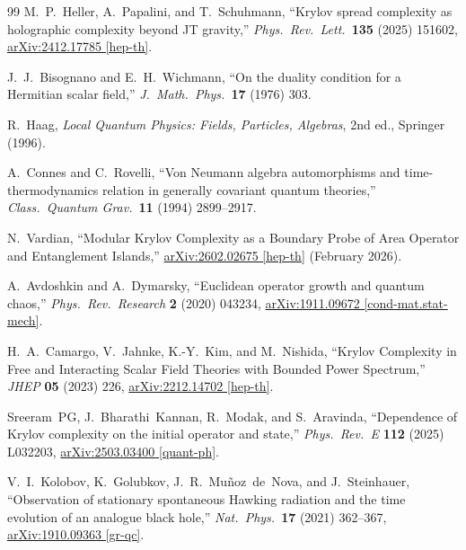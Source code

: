 \documentclass[12pt,a4paper]{article}
\begin{document}
\begin{thebibliography}{99}
M.~P.~Heller, A.~Papalini, and T.~Schuhmann,
``Krylov spread complexity as holographic complexity beyond JT gravity,''
\textit{Phys.\ Rev.\ Lett.}\ \textbf{135} (2025) 151602,
\href{https://arxiv.org/abs/2412.17785}{arXiv:2412.17785 [hep-th]}.

J.~J.~Bisognano and E.~H.~Wichmann,
``On the duality condition for a Hermitian scalar field,''
\textit{J.\ Math.\ Phys.}\ \textbf{17} (1976) 303.

R.~Haag, \textit{Local Quantum Physics: Fields, Particles, Algebras},
2nd ed., Springer (1996).

A.~Connes and C.~Rovelli,
``Von Neumann algebra automorphisms and time-thermodynamics relation in
generally covariant quantum theories,''
\textit{Class.\ Quantum Grav.}\ \textbf{11} (1994) 2899--2917.

N.~Vardian,
``Modular Krylov Complexity as a Boundary Probe of Area Operator and
Entanglement Islands,''
\href{https://arxiv.org/abs/2602.02675}{arXiv:2602.02675 [hep-th]}
(February 2026).

A.~Avdoshkin and A.~Dymarsky,
``Euclidean operator growth and quantum chaos,''
\textit{Phys.\ Rev.\ Research} \textbf{2} (2020) 043234,
\href{https://arxiv.org/abs/1911.09672}{arXiv:1911.09672 [cond-mat.stat-mech]}.

H.~A.~Camargo, V.~Jahnke, K.-Y.~Kim, and M.~Nishida,
``Krylov Complexity in Free and Interacting Scalar Field Theories with
Bounded Power Spectrum,''
\textit{JHEP} \textbf{05} (2023) 226,
\href{https://arxiv.org/abs/2212.14702}{arXiv:2212.14702 [hep-th]}.

Sreeram~PG, J.~Bharathi~Kannan, R.~Modak, and S.~Aravinda,
``Dependence of Krylov complexity on the initial operator and state,''
\textit{Phys.\ Rev.\ E} \textbf{112} (2025) L032203,
\href{https://arxiv.org/abs/2503.03400}{arXiv:2503.03400 [quant-ph]}.

V.~I.~Kolobov, K.~Golubkov, J.~R.~Mu\~{n}oz~de~Nova, and J.~Steinhauer,
``Observation of stationary spontaneous Hawking radiation and the time
evolution of an analogue black hole,''
\textit{Nat.\ Phys.}\ \textbf{17} (2021) 362--367,
\href{https://arxiv.org/abs/1910.09363}{arXiv:1910.09363 [gr-qc]}.


\end{thebibliography}
\end{document}
